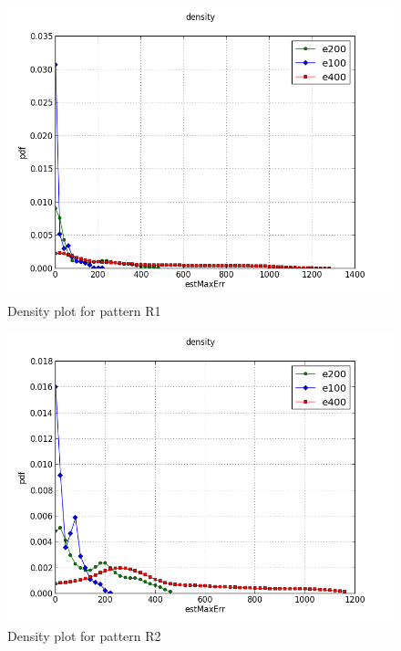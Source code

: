 \documentclass[a4paper, smallheadings,english]{scrartcl}
\begin{document}
\begin{figure}[h!]
    \begin{center}
        \includegraphics[scale=0.6]{plots/task2/density_R1}
    \end{center}
    \caption{Density plot for pattern R1}
    \label{fig:task2_density_r1}
\end{figure}
\begin{figure}[h!]
    \begin{center}
        \includegraphics[scale=0.7]{plots/task2/density_R2}
    \end{center}
    \caption{Density plot for pattern R2}
    \label{fig:task2_density_r2}
\end{figure}
\end{document}
